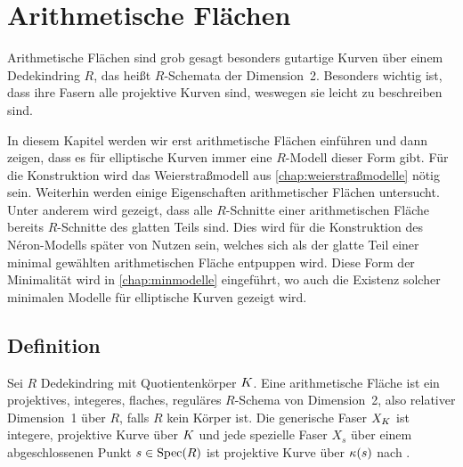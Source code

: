 \chapter{Arithmetische Flächen}\label{chap:arithmetischeflächen}
Arithmetische Flächen sind grob gesagt besonders gutartige Kurven über
einem Dedekindring $R$, das heißt $R$-Schemata der Dimension~2.
Besonders wichtig ist, dass ihre Fasern alle projektive Kurven sind,
weswegen sie leicht zu beschreiben sind.

In diesem Kapitel werden wir erst arithmetische Flächen einführen und
dann zeigen, dass es für elliptische Kurven immer eine $R$-Modell
dieser Form gibt. Für die Konstruktion wird das Weierstraßmodell
aus \autoref{chap:weierstraßmodelle} nötig sein.
Weiterhin werden einige Eigenschaften arithmetischer Flächen
untersucht. Unter anderem wird gezeigt, dass alle $R$-Schnitte einer
arithmetischen Fläche bereits $R$-Schnitte des glatten Teils
sind. Dies wird für die Konstruktion des Néron-Modells später von
Nutzen sein, welches sich als der glatte Teil einer minimal gewählten
arithmetischen Fläche entpuppen wird.
Diese Form der Minimalität wird in \autoref{chap:minmodelle}
eingeführt, wo auch die Existenz solcher minimalen Modelle für
elliptische Kurven gezeigt wird.

\section{Definition}
\begin{Definition}
  Sei $R$ Dedekindring mit Quotientenkörper $K$.
  Eine arithmetische Fläche ist ein projektives, integeres, flaches,
  reguläres $R$-Schema von Dimension~2, also relativer Dimension~1 über
  $R$, falls $R$ kein Körper ist.
  Die generische Faser $X_{K}$ ist integere, projektive Kurve über $K$
  und jede spezielle Faser $X_s$ über einem abgeschlossenen Punkt
  $s\in\operatorname{Spec}(R)$ ist projektive Kurve über $\kappa(s)$ nach \cite[Lemma
  8.3.3]{liu}.
\end{Definition}

